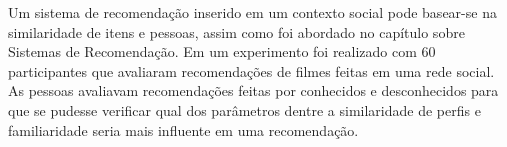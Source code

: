 Um sistema de recomendação inserido em um contexto social pode basear-se na similaridade de itens e pessoas, assim como foi abordado no capítulo sobre Sistemas de Recomendação. Em \cite{bonhard2007devil} um experimento foi realizado com 60 participantes que avaliaram recomendações de filmes feitas em uma rede social. As pessoas avaliavam recomendações feitas por conhecidos e desconhecidos para que se pudesse verificar qual dos parâmetros dentre a similaridade de perfis e familiaridade seria mais influente em uma recomendação.





